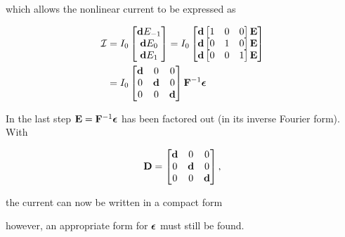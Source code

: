 which allows the nonlinear current to be expressed as

\begin{equation}\label{eqn:ece1254projectReport:900}
\begin{aligned}
\mathcal{I} &=
I_0
\begin{bmatrix}
\Bd E_{-1} \\
\Bd E_{0} \\
\Bd E_{1} \\
\end{bmatrix}
=
I_0
\begin{bmatrix}
\Bd \begin{bmatrix} 1 & 0 & 0 \end{bmatrix} \BE \\
\Bd \begin{bmatrix} 0 & 1 & 0 \end{bmatrix} \BE \\
\Bd \begin{bmatrix} 0 & 0 & 1 \end{bmatrix} \BE
\end{bmatrix} \\
&=
I_0
\begin{bmatrix}
\Bd & 0 & 0 \\
0 & \Bd & 0 \\
0 & 0 & \Bd
\end{bmatrix}
\BF^{-1} \Bepsilon
\end{aligned}
\end{equation}

In the last step \( \mathbf{E} = \mathbf{F}^{-1} \boldsymbol{\epsilon} \) has been factored out (in its inverse Fourier form).
With

\begin{dmath}\label{eqn:ece1254projectReport:920}
\BD =
\begin{bmatrix}
\Bd & 0 & 0 \\
0 & \Bd & 0 \\
0 & 0   & \Bd \\
\end{bmatrix},
\end{dmath}

the current can now be written in a compact form


however, an appropriate form for \( \boldsymbol{\epsilon} \) must still be found.

